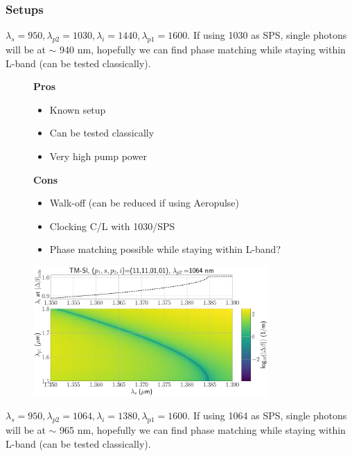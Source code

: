 \documentclass[11pt, headings=optiontoheadandtoc]{article}
\begin{document}
\subsubsection*{Setups}
$\lambda_s=950,\lambda_{p2}=1030,\lambda_i=1440,\lambda_{\mathrm{p1}}=1600$. If using 1030 as SPS, single photons will be at $\sim$ 940 nm, hopefully we can find phase matching while staying within L-band (can be tested classically).
\begin{figure}[h]
\begin{minipage}[t]{0.5\textwidth}
    \textbf{Pros}
    \begin{itemize}
        \item Known setup
        \item Can be tested classically
        \item Very high pump power
    \end{itemize}
\end{minipage}%
\hfill
\begin{minipage}[t]{0.5\textwidth}
    \textbf{Cons}
    \begin{itemize}
        \item Walk-off (can be reduced if using Aeropulse)
        \item Clocking C/L with 1030/SPS
        \item Phase matching possible while staying within L-band?
    \end{itemize}
\end{minipage}
\end{figure}
\newpage
\begin{figure}[h]
    \centering
    \includegraphics[width=0.8\textwidth]{./figs/TMSI_(11,11,01,01)_1064_2d_dbeta.pdf}
    \caption{}
    \label{fig:hom_1064}
\end{figure}
$\lambda_s=950,\lambda_{p2}=1064,\lambda_i=1380,\lambda_{\mathrm{p1}}=1600$. If using 1064 as SPS, single photons will be at $\sim$ 965 nm, hopefully we can find phase matching while staying within L-band (can be tested classically).
\end{document}
